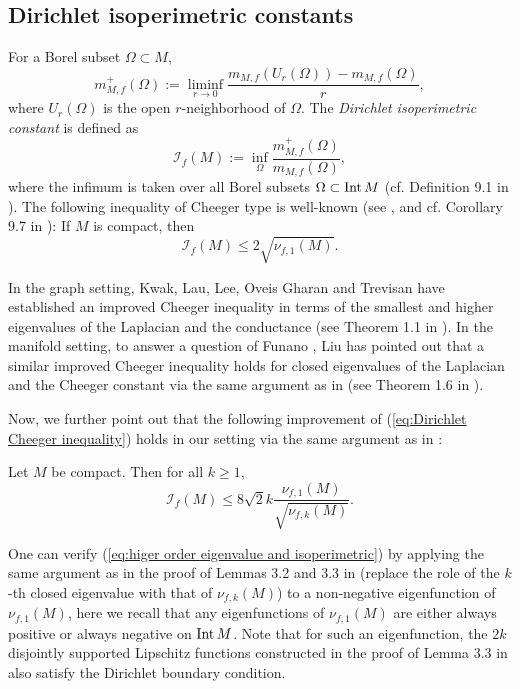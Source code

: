\subsection{Dirichlet isoperimetric constants}\label{sec:Dirichlet isoperimetric constants}
For a Borel subset $\Omega \subset M$,
\begin{equation*}
m^{+}_{M,f}(\Omega):=\liminf_{r\to 0}\frac{m_{M,f}(U_{r}(\Omega))-m_{M,f}(\Omega)}{r},
\end{equation*}
where $U_{r}(\Omega)$ is the open $r$-neighborhood of $\Omega$.
The \textit{Dirichlet isoperimetric constant} is defined as
\begin{equation*}
\mathcal{I}_{f}(M):=\inf_{\Omega} \frac{m^{+}_{M,f}(\Omega)}{m_{M,f}(\Omega)},
\end{equation*}
where the infimum is taken over all Borel subsets $\Omega \subset \mathrm{Int}\, M$ (cf. Definition 9.1 in \cite{L}).
The following inequality of Cheeger type is well-known (see \cite{C}, and cf. Corollary 9.7 in \cite{L}):
If $M$ is compact,
then
\begin{equation}\label{eq:Dirichlet Cheeger inequality}
\mathcal{I}_{f}(M) \leq 2 \sqrt{\nu_{f,1}(M)}.
\end{equation}

In the graph setting,
Kwak, Lau, Lee, Oveis Gharan and Trevisan \cite{KLLOT} have established an improved Cheeger inequality in terms of the smallest and higher eigenvalues of the Laplacian and the conductance (see Theorem 1.1 in \cite{KLLOT}).
In the manifold setting,
to answer a question of Funano \cite{F},
Liu \cite{Liu} has pointed out that
a similar improved Cheeger inequality holds for closed eigenvalues of the Laplacian and the Cheeger constant via the same argument as in \cite{KLLOT} (see Theorem 1.6 in \cite{Liu}).

Now,
we further point out that
the following improvement of (\ref{eq:Dirichlet Cheeger inequality}) holds in our setting via the same argument as in \cite{KLLOT}:
\begin{thm}\label{thm:higer order eigenvalue and isoperimetric}
Let $M$ be compact.
Then for all $k\geq 1$,
\begin{equation}\label{eq:higer order eigenvalue and isoperimetric}
\mathcal{I}_{f}(M) \leq 8\sqrt{2}k\frac{\nu_{f,1}(M)}{\sqrt{\nu_{f,k}(M)}}.
\end{equation}
\end{thm}
One can verify (\ref{eq:higer order eigenvalue and isoperimetric}) by applying the same argument as in the proof of Lemmas 3.2 and 3.3 in \cite{Liu} (replace the role of the $k$-th closed eigenvalue with that of $\nu_{f,k}(M)$) to a non-negative eigenfunction of $\nu_{f,1}(M)$,
here we recall that any eigenfunctions of $\nu_{f,1}(M)$ are either always positive or always negative on $\mathrm{Int}\, M$.
Note that
for such an eigenfunction,
the $2k$ disjointly supported Lipschitz functions constructed in the proof of Lemma 3.3 in \cite{Liu} also satisfy the Dirichlet boundary condition.

